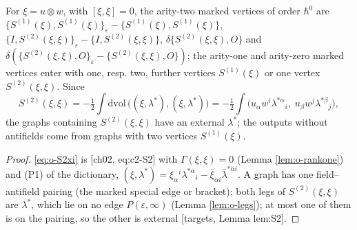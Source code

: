 \begin{proposition}
\label{prop:o-arity2}
For $\xi=u\otimes w$, with $[\xi,\xi]=0$, the arity-two marked vertices of order $\hbar^0$ are $\{S^{(1)}(\xi),S^{(1)}(\xi)\}_\varepsilon-\{S^{(1)}(\xi),S^{(1)}(\xi)\}$, $\{I,S^{(2)}(\xi,\xi)\}_\varepsilon-\{I,S^{(2)}(\xi,\xi)\}$, $\delta\{S^{(2)}(\xi,\xi),O\}$ and $\delta(\{S^{(2)}(\xi,\xi),O\}_\varepsilon-\{S^{(2)}(\xi,\xi),O\})$; the arity-one and arity-zero marked vertices enter with one, resp. two, further vertices $S^{(1)}(\xi)$ or one vertex $S^{(2)}(\xi,\xi)$. Since
\begin{equation}
S^{(2)}(\xi,\xi)=-\tfrac12\int\mathrm{dvol}\,\big((\xi,\lambda^*),(\xi,\lambda^*)\big)=-\tfrac12\int\big(u_\alpha w^i\lambda^{*\alpha}{}_i,\;u_\beta w^j\lambda^{*\beta}{}_j\big),
\label{eq:o-S2xi}
\end{equation}
the graphs containing $S^{(2)}(\xi,\xi)$ have an external $\lambda^*$; the outputs without antifields come from graphs with two vertices $S^{(1)}(\xi)$.
\end{proposition}

\begin{proof}
\eqref{eq:o-S2xi} is [ch02, eq:c2-S2] with $\Gamma(\xi,\xi)=0$ (Lemma \ref{lem:o-rankone}) and (P1) of the dictionary, $(\xi,\lambda^*)=\xi_\alpha{}^i\lambda^{*\alpha}{}_i-\bar\xi_{\dot\alpha i}\bar\lambda^{*\dot\alpha i}$. A graph has one field--antifield pairing (the marked special edge or bracket); both legs of $S^{(2)}(\xi,\xi)$ are $\lambda^*$, which lie on no edge $P(\varepsilon,\infty)$ (Lemma \ref{lem:o-legs}); at most one of them is on the pairing, so the other is external [targets, Lemma lem:S2].
\end{proof}

